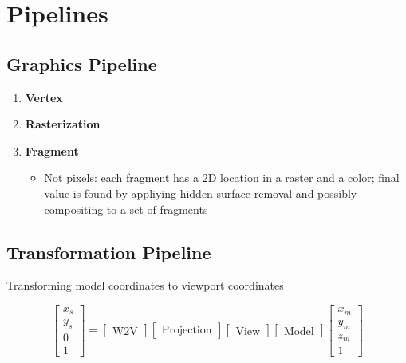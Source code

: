 \chapter{Pipelines}

\section{Graphics Pipeline}

  \begin{enumerate}
    \item \textbf{Vertex}
    \item \textbf{Rasterization}
    \item \textbf{Fragment}
    \begin{itemize}
      \item Not pixels: each fragment has a 2D location in a raster and a color;
      final value is found by appliying hidden surface removal and possibly
      compositing to a set of fragments
    \end{itemize}
  \end{enumerate}

\section{Transformation Pipeline}

  Transforming model coordinates to viewport coordinates

  \begin{equation}
    \begin{bmatrix}
      x_{s} \\
      y_{s} \\
      0 \\
      1
    \end{bmatrix}
    =
    \begin{bmatrix}
      \text{W2V}
    \end{bmatrix}
    \begin{bmatrix}
      \text{Projection}
    \end{bmatrix}
    \begin{bmatrix}
      \text{View}
    \end{bmatrix}
    \begin{bmatrix}
      \text{Model}
    \end{bmatrix}
    \begin{bmatrix}
      x_{m} \\
      y_{m} \\
      z_{m} \\
      1
    \end{bmatrix}
  \end{equation}

